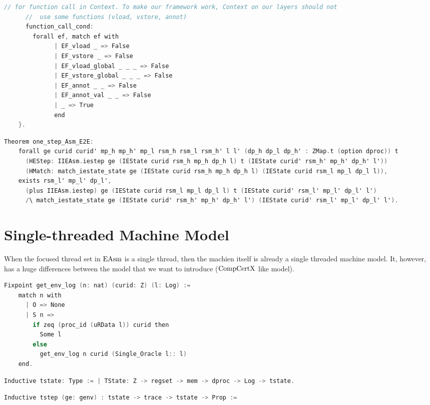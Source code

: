 \begin{lstlisting}[language=C]
      // for function call in Context. To make our framework work, Context on our layers should not 
      //  use some functions (vload, vstore, annot) 
      function_call_cond:
        forall ef, match ef with
              | EF_vload _ => False
              | EF_vstore _ => False
              | EF_vload_global _ _ _ => False
              | EF_vstore_global _ _ _ => False
              | EF_annot _ _ => False
              | EF_annot_val _ _ => False
              | _ => True
              end
    }.
\end{lstlisting}

\begin{lstlisting}[language=C]
  Theorem one_step_Asm_E2E:
    forall ge curid curid' mp_h mp_h' mp_l rsm_h rsm_l rsm_h' l l' (dp_h dp_l dp_h' : ZMap.t (option dproc)) t
      (HEStep: IIEAsm.iestep ge (IEState curid rsm_h mp_h dp_h l) t (IEState curid' rsm_h' mp_h' dp_h' l'))
      (HMatch: match_iestate_state ge (IEState curid rsm_h mp_h dp_h l) (IEState curid rsm_l mp_l dp_l l)),
    exists rsm_l' mp_l' dp_l',
      (plus IIEAsm.iestep) ge (IEState curid rsm_l mp_l dp_l l) t (IEState curid' rsm_l' mp_l' dp_l' l')
      /\ match_iestate_state ge (IEState curid' rsm_h' mp_h' dp_h' l') (IEState curid' rsm_l' mp_l' dp_l' l').
\end{lstlisting}

\section{Single-threaded Machine Model}
\label{chapter:linking:subsec:single-threaded-machine-model}
When the focused thread set in $\mathrm{EAsm}$ is a single thread, then the machien itself is 
already a single threaded machine model. 
It, however, has a huge differences between the model that we want to introduce ($\mathrm{CompCertX}$ like model).

\begin{lstlisting}[language=C]
  Fixpoint get_env_log (n: nat) (curid: Z) (l: Log) :=
    match n with
      | O => None
      | S n =>
        if zeq (proc_id (uRData l)) curid then
          Some l
        else
          get_env_log n curid (Single_Oracle l:: l)
    end.
\end{lstlisting}

\begin{lstlisting}[language=C]
  Inductive tstate: Type := | TState: Z -> regset -> mem -> dproc -> Log -> tstate.
\end{lstlisting}


\begin{lstlisting}[language=C]
  Inductive tstep (ge: genv) : tstate -> trace -> tstate -> Prop :=
\end{lstlisting}

